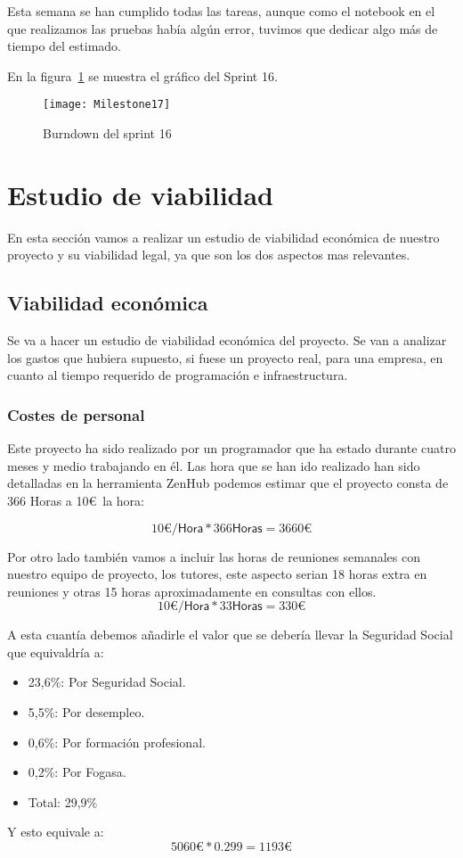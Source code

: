 Esta semana se han cumplido todas las tareas, aunque como el notebook en el que realizamos las pruebas había algún error, tuvimos que dedicar algo más de tiempo del estimado.

En la figura~\ref{fig:Milestone17} se muestra el gráfico del Sprint 16.

\begin{figure}
\centering
\texttt{[image: Milestone17]}
\caption{Burndown del sprint 16}
\label{fig:Milestone17}
\end{figure}

\section{Estudio de viabilidad}
En esta sección vamos a realizar un estudio de viabilidad económica de nuestro proyecto y su viabilidad legal, ya que son los dos aspectos mas relevantes.
\subsection{Viabilidad económica}
Se va a hacer un estudio de viabilidad económica del proyecto. Se van a analizar los gastos que hubiera supuesto, si fuese un proyecto real, para una empresa, en cuanto al tiempo requerido de programación e infraestructura.
\subsubsection{Costes de personal}
Este proyecto ha sido realizado por un programador que ha estado durante cuatro meses y medio trabajando en él.
Las hora que se han ido realizado han sido detalladas en la herramienta ZenHub podemos estimar que el proyecto consta de 366 Horas a 10\euro~la hora:

\[10\euro /\textsf{Hora}*366\textsf{Horas}=3660 \euro \]

Por otro lado también vamos a incluir las horas de reuniones semanales con nuestro equipo de proyecto, los tutores, este aspecto serian 18 horas extra en reuniones y otras 15 horas aproximadamente en consultas con ellos.
\[10{\euro} /\textsf{Hora}*33\textsf{Horas}=330{\euro} \]

A esta cuantía debemos añadirle el valor que se debería llevar la Seguridad Social que equivaldría a:
\begin{itemize}
\item 23,6\%: Por Seguridad Social.
\item 5,5\%: Por desempleo.
\item 0,6\%: Por formación profesional.
\item 0,2\%: Por Fogasa.
\item Total: 29,9\% 
\end{itemize}
Y esto equivale a: 
\[5060\euro{}*0.299=1193\euro{}\]
